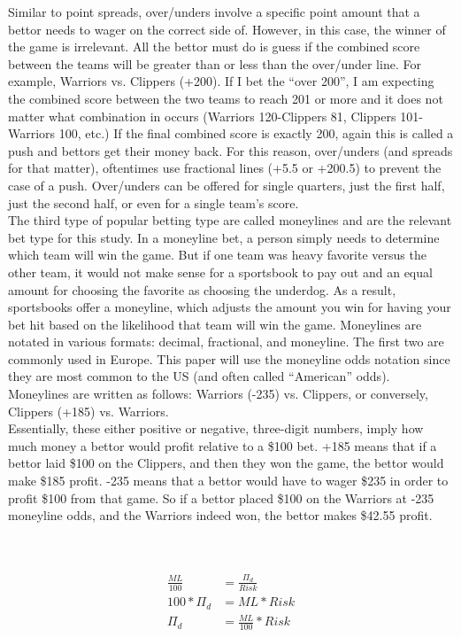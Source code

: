 \documentclass [MS] {uclathes}
\begin{document}
\noindent Similar to point spreads, over/unders involve a specific point amount that a bettor needs to wager on the correct side of. However, in this case, the winner of the game is irrelevant. All the bettor must do is guess if the combined score between the teams will be greater than or less than the over/under line. For example, Warriors vs. Clippers (+200). If I bet the ``over 200'', I am expecting the combined score between the two teams to reach 201 or more and it does not matter what combination in occurs (Warriors 120-Clippers 81, Clippers 101-Warriors 100, etc.) If the final combined score is exactly 200, again this is called a push and bettors get their money back. For this reason, over/unders (and spreads for that matter), oftentimes use fractional lines (+5.5 or +200.5) to prevent the case of a push. Over/unders can be offered for single quarters, just the first half, just the second half, or even for a single team's score.\\

\noindent The third type of popular betting type are called moneylines and are the relevant bet type for this study. In a moneyline bet, a person simply needs to determine which team will win the game. But if one team was heavy favorite versus the other team, it would not make sense for a sportsbook to pay out and an equal amount for choosing the favorite as choosing the underdog. As a result, sportsbooks offer a moneyline, which adjusts the amount you win for having your bet hit based on the likelihood that team will win the game. Moneylines are notated in various formats: decimal, fractional, and moneyline. The first two are commonly used in Europe. This paper will use the moneyline odds notation since they are most common to the US (and often called ``American'' odds). Moneylines are written as follows: Warriors (-235) vs. Clippers, or conversely, Clippers (+185) vs. Warriors. \\

\noindent Essentially, these either positive or negative, three-digit numbers, imply how much money a bettor would profit relative to a \$100 bet. +185 means that if a bettor laid \$100 on the Clippers, and then they won the game, the bettor would make \$185 profit. -235 means that a bettor would have to wager \$235 in order to profit \$100 from that game. So if a bettor placed \$100 on the Warriors at -235 moneyline odds, and the Warriors indeed won, the bettor makes \$42.55 profit. 

\noindent {} \\
 \\
\begin{equation} \label{ml_prof_dog}
\begin{split}
\frac{ML}{100}  & = \frac{\Pi_{d}}{Risk}  \\
100*\Pi_{d} & = ML*Risk    \\
\Pi_{d} & = \frac{ML}{100} * Risk 
\end{split}
\end{equation}
\end{document}

